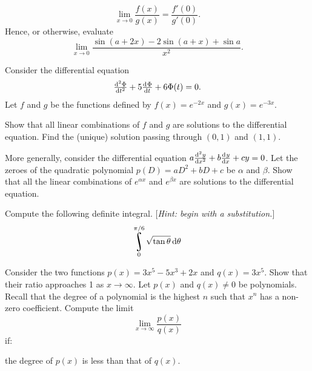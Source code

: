 \begin{questions}
\begin{displaymath}
              \lim_{x \to 0} \frac{f(x)}{g(x)} = \frac{f'(0)}{g'(0)}.
            \end{displaymath}
            Hence, or otherwise, evaluate
            \begin{displaymath}
              \lim_{x \to 0} \frac{\sin(a + 2x) - 2\sin(a + x) + \sin a}{x^2}.
            \end{displaymath}
  \question
    \begin{parts}
      \parS Consider the differential equation
            \begin{displaymath}
              \od[2]{\Phi}{t} + 5\od{\Phi}{t} + 6\Phi(t) = 0.
            \end{displaymath}
            Let $ f $ and $ g $ be the functions defined by $ f(x) = e^{-2x} $ and $ g(x) = e^{-3x} $.
            \begin{subparts}
              \subpart Show that all linear combinations of $ f $ and $ g $ are solutions to the differential equation.
              \subpart Find the (unique) solution passing through $ (0,1) $ and $ (1,1) $.
            \end{subparts}
      \parO More generally, consider the differential equation $ a\od[2]{y}{x} + b\od{y}{x} + cy = 0 $. Let
            the zeroes of the quadratic polynomial $ p(D) = aD^2 + bD + c $ be $ \alpha $ and $ \beta $. Show
            that all the linear combinations of $ e^{\alpha x} $ and $ e^{\beta x} $ are solutions to the differential
            equation.
    \end{parts}
  \questioS Compute the following definite integral. [\textit{Hint: begin with a substitution.}]
            \begin{displaymath}
              \rint_0^{\pi/6} \sqrt{\tan \theta} \dif{\theta}
            \end{displaymath}
  \question
    \begin{parts}
      \parE Consider the two functions $ p(x) = 3x^5 - 5x^3 + 2x $ and $ q(x) = 3x^5 $. Show that their ratio approaches
            1 as $ x \to \infty $.
      \parS Let $ p(x) $ and $ q(x) \neq 0 $ be polynomials. Recall that the degree of a polynomial is the highest $ n $ such that $ x^n $
            has a non-zero coefficient. Compute the limit
            \begin{displaymath}
              \lim_{x \to \infty} \frac{p(x)}{q(x)}
            \end{displaymath}
            if:
        \begin{subparts}
          \subpart the degree of $ p(x) $ is less than that of $ q(x) $.

\end{subparts}
\end{parts}
\end{questions}
